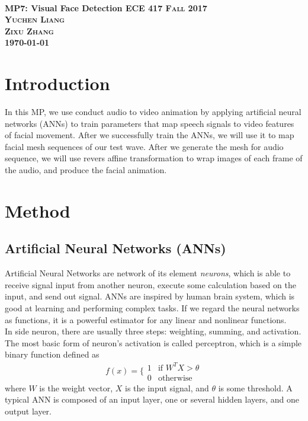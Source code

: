 \documentclass{article}
\begin{document}
	
	\everymath{\displaystyle}
	\begin{titlepage}	 	
		\center
		\text{}\\[3cm]
		\linespread{2}\huge \bfseries MP7: Visual Face Detection
		\center\textsc{\Large ECE 417 Fall 2017}\\[1cm]
		\Large\center\textsc{Yuchen Liang\\ Zixu Zhang  }\\[1.4cm]
		\Large \today\\
		\vfill
	\end{titlepage}
	\setlength{\baselineskip}{24pt}
	\onehalfspacing
	\section{Introduction}
	In this MP, we use conduct audio to video animation by applying artificial neural networks (ANNs) to train parameters that map speech signals to video features of facial movement. After we successfully train the ANNs, we will use it to map facial mesh sequences of our test wave. After we generate the mesh for audio sequence, we will use revers affine transformation to wrap images of each frame of the audio, and produce the facial animation.
	
	\section{Method}
	\subsection{Artificial Neural Networks (ANNs)}
	Artificial Neural Networks are network of its element \textit{neurons}, which is able to receive signal input from another neuron, execute some calculation based on the input, and send out signal. ANNs are inspired by human brain system, which is good at learning and performing complex tasks. If we regard the neural networks as functions, it is a powerful estimator for any linear and nonlinear functions.  \\
	In side neuron, there are usually three steps: weighting, summing, and activation. The most basic form of neuron's activation is called perceptron, which is a simple binary function defined as
	\begin{equation}
	f(x)=\bigg\{\begin{array}{cc}
	1 & \text{if }W^TX>\theta\\
	0 & \text{otherwise}
	\end{array}
	\end{equation}
	where $W$ is the weight vector, $X$ is the input signal, and $\theta$ is some threshold. A typical ANN is composed of an input layer, one or several hidden layers, and one output layer.
\end{document}
